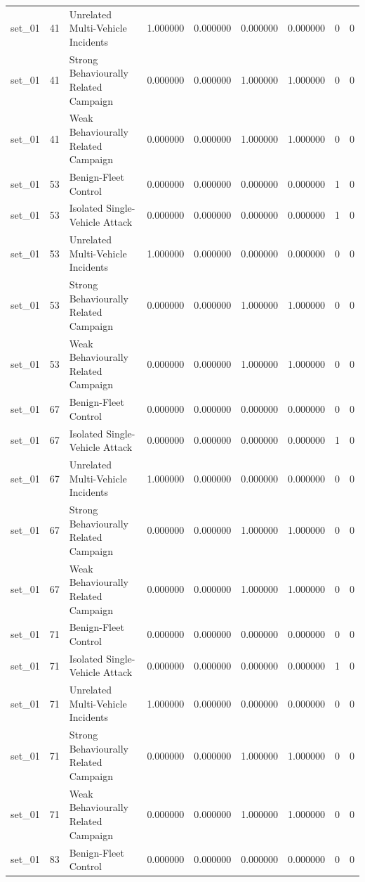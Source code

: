 \begin{tabular}{lrlrrrrrr}
set_01 & 41 & Unrelated Multi-Vehicle Incidents & 1.000000 & 0.000000 & 0.000000 & 0.000000 & 0 & 0 \\
set_01 & 41 & Strong Behaviourally Related Campaign & 0.000000 & 0.000000 & 1.000000 & 1.000000 & 0 & 0 \\
set_01 & 41 & Weak Behaviourally Related Campaign & 0.000000 & 0.000000 & 1.000000 & 1.000000 & 0 & 0 \\
set_01 & 53 & Benign-Fleet Control & 0.000000 & 0.000000 & 0.000000 & 0.000000 & 1 & 0 \\
set_01 & 53 & Isolated Single-Vehicle Attack & 0.000000 & 0.000000 & 0.000000 & 0.000000 & 1 & 0 \\
set_01 & 53 & Unrelated Multi-Vehicle Incidents & 1.000000 & 0.000000 & 0.000000 & 0.000000 & 0 & 0 \\
set_01 & 53 & Strong Behaviourally Related Campaign & 0.000000 & 0.000000 & 1.000000 & 1.000000 & 0 & 0 \\
set_01 & 53 & Weak Behaviourally Related Campaign & 0.000000 & 0.000000 & 1.000000 & 1.000000 & 0 & 0 \\
set_01 & 67 & Benign-Fleet Control & 0.000000 & 0.000000 & 0.000000 & 0.000000 & 0 & 0 \\
set_01 & 67 & Isolated Single-Vehicle Attack & 0.000000 & 0.000000 & 0.000000 & 0.000000 & 1 & 0 \\
set_01 & 67 & Unrelated Multi-Vehicle Incidents & 1.000000 & 0.000000 & 0.000000 & 0.000000 & 0 & 0 \\
set_01 & 67 & Strong Behaviourally Related Campaign & 0.000000 & 0.000000 & 1.000000 & 1.000000 & 0 & 0 \\
set_01 & 67 & Weak Behaviourally Related Campaign & 0.000000 & 0.000000 & 1.000000 & 1.000000 & 0 & 0 \\
set_01 & 71 & Benign-Fleet Control & 0.000000 & 0.000000 & 0.000000 & 0.000000 & 0 & 0 \\
set_01 & 71 & Isolated Single-Vehicle Attack & 0.000000 & 0.000000 & 0.000000 & 0.000000 & 1 & 0 \\
set_01 & 71 & Unrelated Multi-Vehicle Incidents & 1.000000 & 0.000000 & 0.000000 & 0.000000 & 0 & 0 \\
set_01 & 71 & Strong Behaviourally Related Campaign & 0.000000 & 0.000000 & 1.000000 & 1.000000 & 0 & 0 \\
set_01 & 71 & Weak Behaviourally Related Campaign & 0.000000 & 0.000000 & 1.000000 & 1.000000 & 0 & 0 \\
set_01 & 83 & Benign-Fleet Control & 0.000000 & 0.000000 & 0.000000 & 0.000000 & 0 & 0 \\

\end{tabular}
